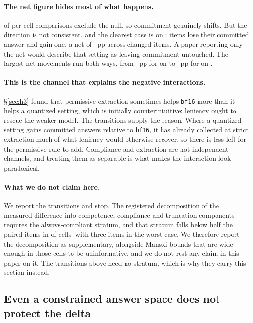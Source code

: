 \documentclass[conference]{IEEEtran}
\begin{document}
\paragraph{The net figure hides most of what happens.}
\hFourExcludesNull{} of \hFourEffects{} per-cell comparisons exclude the null, so
commitment genuinely shifts. But the direction is not consistent, and the clearest case
is \hFourChurnArm{} on \hFourChurnTask: \hFourChurnLost{} items lose their committed
answer and \hFourChurnGained{} gain one, a net of \hFourChurnNet~pp across
\hFourChurnTotal{} changed items. A paper reporting only the net would describe that
setting as leaving commitment untouched. The largest net movements run both ways, from
\hFourGainNet~pp for \hFourGainArm{} on \hFourGainTask{} to \hFourLossNet~pp for
\hFourLossArm{} on \hFourLossTask.

\paragraph{This is the channel that explains the negative interactions.}
\S\ref{sec:h3} found that permissive extraction sometimes helps \texttt{bf16} more than
it helps a quantized setting, which is initially counterintuitive: leniency ought to
rescue the weaker model. The transitions supply the reason. Where a quantized setting
gains committed answers relative to \texttt{bf16}, it has already collected at strict
extraction much of what leniency would otherwise recover, so there is less left for the
permissive rule to add. Compliance and extraction are not independent channels, and
treating them as separable is what makes the interaction look paradoxical.

\paragraph{What we do not claim here.}
We report the transitions and stop. The registered decomposition of the measured
difference into competence, compliance and truncation components requires the
always-compliant stratum, and that stratum falls below half the paired items in
\hFourStratumBelowHalf{} of \hFourStratumCells{} cells, with three items in the worst
case. We therefore report the decomposition as supplementary, alongside Manski bounds
that are wide enough in those cells to be uninformative, and we do not rest any claim in
this paper on it. The transitions above need no stratum, which is why they carry this
section instead.

\subsection{Even a constrained answer space does not protect the delta}
\label{sec:h5h6}
\end{document}

